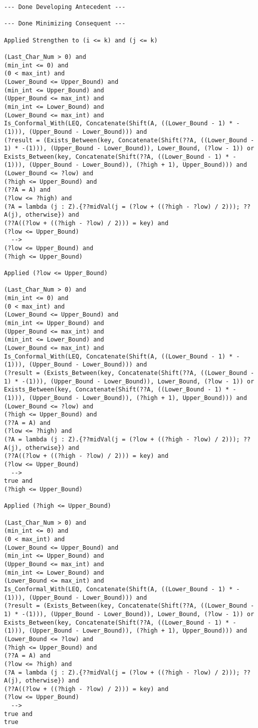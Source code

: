\begin{lstlisting}[language=resolve]
--- Done Developing Antecedent ---

--- Done Minimizing Consequent ---

Applied Strengthen to (i <= k) and (j <= k)

(Last_Char_Num > 0) and
(min_int <= 0) and
(0 < max_int) and
(Lower_Bound <= Upper_Bound) and
(min_int <= Upper_Bound) and
(Upper_Bound <= max_int) and
(min_int <= Lower_Bound) and
(Lower_Bound <= max_int) and
Is_Conformal_With(LEQ, Concatenate(Shift(A, ((Lower_Bound - 1) * -(1))), (Upper_Bound - Lower_Bound))) and
(?result = (Exists_Between(key, Concatenate(Shift(??A, ((Lower_Bound - 1) * -(1))), (Upper_Bound - Lower_Bound)), Lower_Bound, (?low - 1)) or Exists_Between(key, Concatenate(Shift(??A, ((Lower_Bound - 1) * -(1))), (Upper_Bound - Lower_Bound)), (?high + 1), Upper_Bound))) and
(Lower_Bound <= ?low) and
(?high <= Upper_Bound) and
(??A = A) and
(?low <= ?high) and
(?A = lambda (j : Z).{??midVal(j = (?low + ((?high - ?low) / 2))); ??A(j), otherwise}) and
(??A((?low + ((?high - ?low) / 2))) = key) and
(?low <= Upper_Bound)
  -->
(?low <= Upper_Bound) and
(?high <= Upper_Bound)

Applied (?low <= Upper_Bound)

(Last_Char_Num > 0) and
(min_int <= 0) and
(0 < max_int) and
(Lower_Bound <= Upper_Bound) and
(min_int <= Upper_Bound) and
(Upper_Bound <= max_int) and
(min_int <= Lower_Bound) and
(Lower_Bound <= max_int) and
Is_Conformal_With(LEQ, Concatenate(Shift(A, ((Lower_Bound - 1) * -(1))), (Upper_Bound - Lower_Bound))) and
(?result = (Exists_Between(key, Concatenate(Shift(??A, ((Lower_Bound - 1) * -(1))), (Upper_Bound - Lower_Bound)), Lower_Bound, (?low - 1)) or Exists_Between(key, Concatenate(Shift(??A, ((Lower_Bound - 1) * -(1))), (Upper_Bound - Lower_Bound)), (?high + 1), Upper_Bound))) and
(Lower_Bound <= ?low) and
(?high <= Upper_Bound) and
(??A = A) and
(?low <= ?high) and
(?A = lambda (j : Z).{??midVal(j = (?low + ((?high - ?low) / 2))); ??A(j), otherwise}) and
(??A((?low + ((?high - ?low) / 2))) = key) and
(?low <= Upper_Bound)
  -->
true and
(?high <= Upper_Bound)

Applied (?high <= Upper_Bound)

(Last_Char_Num > 0) and
(min_int <= 0) and
(0 < max_int) and
(Lower_Bound <= Upper_Bound) and
(min_int <= Upper_Bound) and
(Upper_Bound <= max_int) and
(min_int <= Lower_Bound) and
(Lower_Bound <= max_int) and
Is_Conformal_With(LEQ, Concatenate(Shift(A, ((Lower_Bound - 1) * -(1))), (Upper_Bound - Lower_Bound))) and
(?result = (Exists_Between(key, Concatenate(Shift(??A, ((Lower_Bound - 1) * -(1))), (Upper_Bound - Lower_Bound)), Lower_Bound, (?low - 1)) or Exists_Between(key, Concatenate(Shift(??A, ((Lower_Bound - 1) * -(1))), (Upper_Bound - Lower_Bound)), (?high + 1), Upper_Bound))) and
(Lower_Bound <= ?low) and
(?high <= Upper_Bound) and
(??A = A) and
(?low <= ?high) and
(?A = lambda (j : Z).{??midVal(j = (?low + ((?high - ?low) / 2))); ??A(j), otherwise}) and
(??A((?low + ((?high - ?low) / 2))) = key) and
(?low <= Upper_Bound)
  -->
true and
true


\end{lstlisting}
